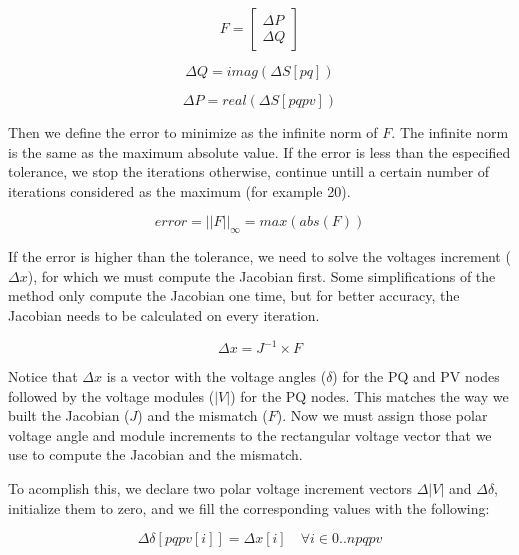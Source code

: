 \documentclass{tufte-book}
\begin{document}
\begin{equation}
F =  \left[
\begin{array}{c}
\Delta P \\
\Delta Q  
\end{array}
\right]
\label{eq:nr_mismatch}
\end{equation}

\begin{equation}
\Delta Q = imag(\Delta S[pq]) 
\label{eq:nr_q_inc}
\end{equation}

\begin{equation}
\Delta P = real(\Delta S[pqpv])
\label{eq:nr_p_inc}
\end{equation}

Then we define the error to minimize as the infinite norm of $F$. The infinite norm is the same as the maximum absolute value. If the error is less than the especified tolerance, we stop the iterations otherwise, continue untill a certain number of iterations considered as the maximum (for example 20).

\begin{equation}
error = ||F||_{\infty} = max(abs(F))
\label{eq:nr_error}
\end{equation}

If the error is higher than the tolerance, we need to solve the voltages increment ($\Delta x$), for which we must compute the Jacobian first. Some simplifications of the method only compute the Jacobian one time, but for better accuracy, the Jacobian needs to be calculated on every iteration.

\begin{equation}
\Delta x = J^{-1} \times F
\label{eq:nr_solve}
\end{equation}

Notice that $\Delta x$ is a vector with the voltage angles ($\delta$) for the PQ and PV nodes followed by the voltage modules ($|V|$) for the PQ nodes. This matches the way we built the Jacobian ($J$) and the mismatch ($F$). Now we must assign those polar voltage angle and module increments to the rectangular voltage vector that we use to compute the Jacobian and the mismatch.

To acomplish this, we declare two polar voltage increment vectors $\Delta |V|$ and $\Delta \delta$, initialize them to zero, and we fill the corresponding values with the following:

\begin{equation}
\Delta \delta[pqpv[i]] = \Delta x[i]  \quad \forall i \in {0..npqpv}
\label{eq:nr_dd1}
\end{equation}
\end{document}
